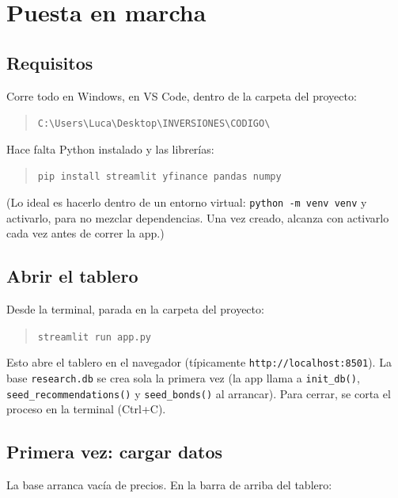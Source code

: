 \documentclass[11pt,a4paper]{article}
\newcommand{\code}[1]{\texttt{#1}}
\newcommand{\fpath}[1]{\texttt{#1}}
\begin{document}
\section{Puesta en marcha}

\subsection{Requisitos}

Corre todo en Windows, en VS Code, dentro de la carpeta del proyecto:

\begin{quote}
\fpath{C:\textbackslash\allowbreak Users\textbackslash\allowbreak Luca\textbackslash\allowbreak Desktop\textbackslash\allowbreak INVERSIONES\textbackslash\allowbreak CODIGO\textbackslash}
\end{quote}

\noindent Hace falta Python instalado y las librer\'ias:

\begin{quote}
\code{pip install streamlit yfinance pandas numpy}
\end{quote}

\noindent (Lo ideal es hacerlo dentro de un entorno virtual: \code{python -m venv venv}
y activarlo, para no mezclar dependencias. Una vez creado, alcanza con activarlo cada
vez antes de correr la app.)

\subsection{Abrir el tablero}

Desde la terminal, parada en la carpeta del proyecto:

\begin{quote}
\code{streamlit run app.py}
\end{quote}

Esto abre el tablero en el navegador (t\'ipicamente \code{http://localhost:8501}). La
base \fpath{research.db} se crea sola la primera vez (la app llama a \code{init\_db()},
\code{seed\_recommendations()} y \code{seed\_bonds()} al arrancar). Para cerrar, se
corta el proceso en la terminal (Ctrl+C).

\subsection{Primera vez: cargar datos}

La base arranca vac\'ia de precios. En la barra de arriba del tablero:
\end{document}
